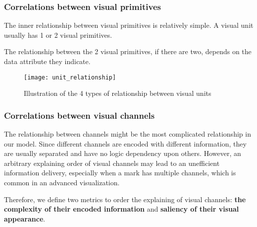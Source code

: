 \subsubsection{Correlations between visual primitives}
The inner relationship between visual primitives is relatively simple.
A visual unit usually has 1 or 2 visual primitives. 

The relationship between the 2 visual primitives, if there are two, depends on the data attribute they indicate. 


\begin{figure}[tb]
 \centering %
 \texttt{[image: unit\_relationship]}
 \caption{Illustration of the 4 types of relationship between visual units}
 \label{fig:relationship}
\end{figure}

\subsubsection{Correlations between visual channels}
The relationship between channels might be the most complicated relationship in our model. Since different channels are encoded with different information, they are usually separated and have no logic dependency upon others. However, an arbitrary explaining order of visual channels may lead to an unefficient information delivery, especially when a mark has multiple channels, which is common in an advanced visualization. 

Therefore, we define two metrics to order the explaining of visual channels: \textbf{the complexity of their encoded information} and \textbf{saliency of their visual appearance}.

